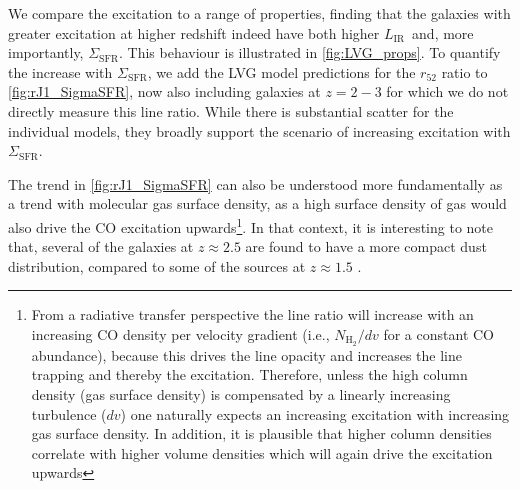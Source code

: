 \documentclass[twocolumn]{aastex62}
\newcommand{\LIR}{\ensuremath{L_{\mathrm{IR}}}}
\newcommand{\SigmaSFR}{\ensuremath{\Sigma_{\mathrm{SFR}}}}
\newcommand{\HH}{\ensuremath{\mathrm{H}_{2}}}
\begin{document}
We compare the excitation to a range of properties, finding that the galaxies
with greater excitation at higher redshift indeed have both higher \LIR\ and,
more importantly, \SigmaSFR.  This behaviour is illustrated in
\autoref{fig:LVG_props}.  To quantify the increase with \SigmaSFR, we add the
LVG model predictions for the $r_{52}$ ratio to \autoref{fig:rJ1_SigmaSFR}, now
also including galaxies at $z=2-3$ for which we do not directly measure this
line ratio.  While there is substantial scatter for the individual models, they
broadly support the scenario of increasing excitation with \SigmaSFR.

The trend in \autoref{fig:rJ1_SigmaSFR} can also be understood more
fundamentally as a trend with molecular gas surface density, as a high surface
density of gas would also drive the CO excitation upwards\footnote{From a
  radiative transfer perspective the line ratio will increase with an
  increasing CO density per velocity gradient (i.e., $N_{\HH}/dv$ for a
  constant CO abundance), because this drives the line opacity and increases
  the line trapping and thereby the excitation.  Therefore, unless the high
  column density (gas surface density) is compensated by a linearly increasing
  turbulence ($dv$) one naturally expects an increasing excitation with
  increasing gas surface density.  In addition, it is plausible that higher
  column densities correlate with higher volume densities which will again
  drive the excitation upwards}.  In that context, it is interesting to note
that, several of the galaxies at $z\approx 2.5$ are found to have a more
compact dust distribution, compared to some of the sources at $z\approx 1.5$
\citep{Rujopakarn2019, Kaasinen2020}.
\end{document}
